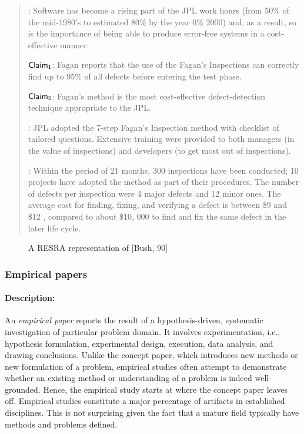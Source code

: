 \small
\begin{quotation}
  : Software has become a rising part of the JPL
  work hours (from 50\% of the mid-1980's to estimated 80\% by the year
  0\% 2000) and, as a result, so is the importance of being able to produce
  error-free systems in a cost-effective manner.
  
  \noindent \( {\sf Claim_{1}} \): Fagan reports that the use of the
  Fagan's Inspections can correctly find up to 95\% of all defects before
  entering the test phase.
  
  \noindent \( {\sf Claim_{2}} \): Fagan's method is the most
  cost-effective defect-detection technique appropriate to the JPL.
  
  : JPL adopted the 7-step Fagan's Inspection method
  with checklist of tailored questions. Extensive training were provided to
  both managers (in the value of inspections) and developers (to get most out
  of inspections).

  : Within the period of 21 months, 300 inspections
  have been conducted; 10 projects have adopted the method as part of their
  procedures. The number of defects per inspection were 4 major defects and
  12 minor ones. The average cost for finding, fixing, and verifying a
  defect is between \$9 and \$12 , compared to about \$10, 000 to find and
  fix the same defect in the later life cycle.
\end{quotation}
\normalsize

\begin{figure}[htb]
  \caption{A RESRA representation of [Bush, 90]}
  \label{fig:bush}
\end{figure}


\subsubsection{Empirical papers}

\paragraph{Description:}

An {\it empirical paper} reports the result of a hypothesis-driven,
systematic investigation of particular problem domain. It involves
experimentation, i.e., hypothesis formulation, experimental design,
execution, data analysis, and drawing conclusions. Unlike the concept
paper, which introduces new methods or new formulation of a problem,
empirical studies often attempt to demonstrate whether an existing method
or understanding of a problem is indeed well-grounded. Hence, the empirical
study starts at where the concept paper leaves off. Empirical studies
constitute a major percentage of artifacts in established disciplines.
This is not surprising given the fact that a mature field typically have
methods and problems defined.

